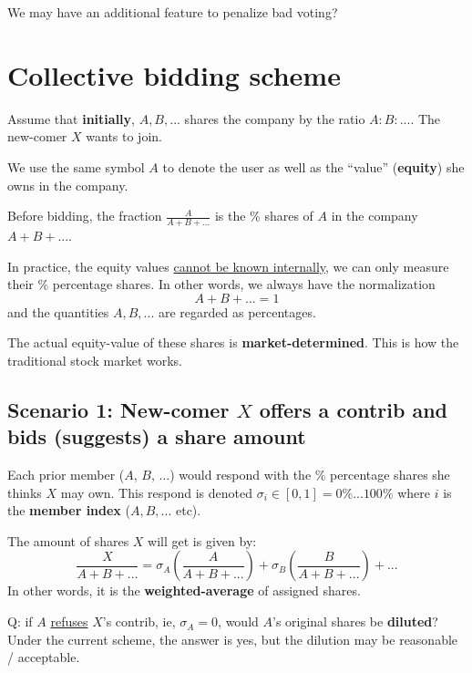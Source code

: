 \documentclass[12pt, orivec]{article}
\begin{document}
We may have an additional feature to penalize bad voting?

\iffalse

\section{Collective bidding scheme}

Assume that \textbf{initially}, $A, B, ...$ shares the company by the ratio $A : B : ...$.  The new-comer $X$ wants to join.

We use the same symbol $A$ to denote the user as well as the ``value'' (\textbf{equity}) she owns in the company.  

Before bidding, the fraction $\frac{A}{A + B + ...}$ is the \% shares of $A$ in the company $A + B + ...$.

In practice, the equity values \uline{cannot be known internally}, we can only measure their \% percentage shares.  In other words, we always have the normalization
\begin{equation}
A + B + ... = 1
\end{equation}
and the quantities $A, B, ...$ are regarded as percentages.

The actual equity-value of these shares is \textbf{market-determined}.  This is how the traditional stock market works.

\subsection{Scenario 1:  New-comer $X$ offers a contrib and bids (suggests) a share amount}

Each prior member ($A$, $B$, ...) would respond with the \% percentage shares she thinks $X$ may own.  This respond is denoted $\sigma_i \in [0,1] = 0\% ... 100\%$ where $i$ is the \textbf{member index} ($A, B, ... $ etc).

The amount of shares $X$ will get is given by:
\begin{equation}
\label{shares-assigned-to-X}
\frac{X}{A + B + ...} = \sigma_A (\frac{A}{A + B + ...}) + \sigma_B (\frac{B}{A + B + ...}) + ...
\end{equation}
In other words, it is the \textbf{weighted-average} of assigned shares.

Q:  if $A$ \uline{refuses} $X$'s contrib, ie, $\sigma_A = 0$, would $A$'s original shares be \textbf{diluted}?  Under the current scheme, the answer is yes, but the dilution may be reasonable / acceptable.
\end{document}
